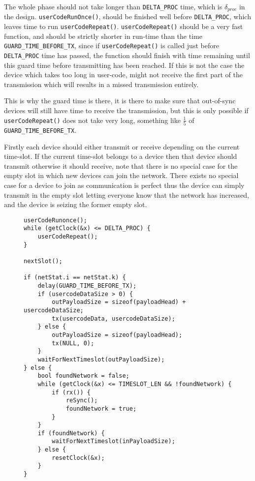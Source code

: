 The whole phase should not take longer than \texttt{DELTA\_PROC} time, which is $\delta_{proc}$ in the design.
\texttt{userCodeRunOnce()}, should be finished well before \texttt{DELTA\_PROC}, which leaves time to run \texttt{userCodeRepeat()}.
\texttt{userCodeRepeat()} should be a very fast function, and should be strictly shorter in run-time than the time \texttt{GUARD\_TIME\_BEFORE\_TX}, since if \texttt{userCodeRepeat()} is called just before \texttt{DELTA\_PROC} time has passed, the function should finish with time remaining until this guard time before transmitting has been reached.
If this is not the case the device which takes too long in user-code, might not receive the first part of the transmission which will results in a missed transmission entirely.

This is why the guard time is there, it is there to make sure that out-of-sync devices will still have time to receive the transmission, but this is only possible if \texttt{userCodeRepeat()} does not take very long, something like $\frac{1}{5}$ of \texttt{GUARD\_TIME\_BEFORE\_TX}.

Firstly each device should either transmit or receive depending on the current time-slot. 
If the current time-slot belongs to a device then that device should transmit otherwise it should receive, note that there is no special case for the empty slot in which new devices can join the network.
There exists no special case for a device to join as communication is perfect thus the device can simply transmit in the empty slot letting everyone know that the network has increased, and the device is seizing the former empty slot.
\begin{figure}
\begin{lstlisting}[style=customc,caption={Important parts of the main loop.},label={lst:ccrc:rxortx}]
userCodeRunonce();
while (getClock(&x) <= DELTA_PROC) {
    userCodeRepeat();
}

nextSlot();

if (netStat.i == netStat.k) {
    delay(GUARD_TIME_BEFORE_TX);
    if (usercodeDataSize > 0) {
        outPayloadSize = sizeof(payloadHead) + usercodeDataSize;
        tx(usercodeData, usercodeDataSize);
    } else {
        outPayloadSize = sizeof(payloadHead);
        tx(NULL, 0);
    }
    waitForNextTimeslot(outPayloadSize);
} else {
    bool foundNetwork = false;
    while (getClock(&x) <= TIMESLOT_LEN && !foundNetwork) {
        if (rx()) {
            reSync();
            foundNetwork = true;
        }
    }
    if (foundNetwork) {
        waitForNextTimeslot(inPayloadSize);
    } else {
        resetClock(&x);
    }
}
\end{lstlisting}
\end{figure}

